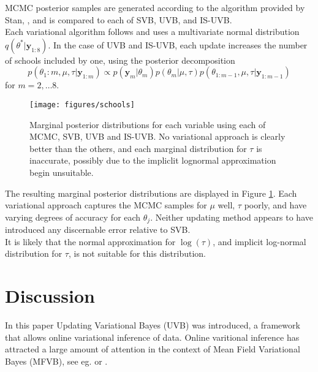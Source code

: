 \documentclass[12pt,a4paper]{article}\usepackage[]{graphicx}\usepackage[]{color}
\begin{document}
MCMC posterior samples are generated according to the algorithm provided by Stan, \citep{RStanGettingStarted}, and is compared to each of SVB, UVB, and IS-UVB.
\\

Each variational algorithm follows \citet{Kucukelbir2017} and uses a multivariate normal distribution $q(\theta^* | \textbf{y}_{1:8})$. In the case of UVB and IS-UVB, each update increases the number of schools included by one, using the posterior decomposition
\begin{equation}
\label{schools:update}
p(\theta_1:m, \mu, \tau | \textbf{y}_{1:m}) \propto p(\textbf{y}_m | \theta_m)p(\theta_m | \mu, \tau)p(\theta_{1:m-1}, \mu, \tau | \textbf{y}_{1:m-1})
\end{equation}
for $m = 2, \ldots 8$.
\\

\begin{figure}[htbp]
\centering
\texttt{[image: figures/schools]}
\caption{Marginal posterior distributions for each variable using each of MCMC, SVB, UVB and IS-UVB. No variational approach is clearly better than the others, and each marginal distribution for $\tau$ is inaccurate, possibly due to the impliclit lognormal approximation begin unsuitable.}
\label{fig:schools}
\end{figure}

The resulting marginal posterior distributions are displayed in Figure \ref{fig:schools}. Each variational approach captures the MCMC samples for $\mu$ well, $\tau$ poorly, and have varying degrees of accuracy for each $\theta_j$. Neither updating method appears to have introduced any discernable error relative to SVB. 
\\

It is likely that the normal approximation for $\log(\tau)$, and implicit log-normal distribution for $\tau$, is not suitable for this distribution.

\section{Discussion}
\label{sec:UVBSummary}

In this paper Updating Variational Bayes (UVB) was introduced, a framework that allows online variational inference of data. Online varitional inference has attracted a large amount of attention in the context of Mean Field Variational Bayes (MFVB), see eg. \cite{Hoffman2010} or \cite{Broderick2013}. 
\\
\end{document}
